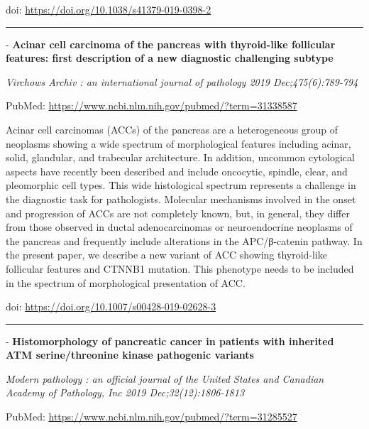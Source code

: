 \documentclass[
]{article}
\renewcommand{\linethickness}{0.05em}
\begin{document}
doi: \url{https://doi.org/10.1038/s41379-019-0398-2}

\begin{center}\rule{0.5\linewidth}{\linethickness}\end{center}

- \textbf{Acinar cell carcinoma of the pancreas with thyroid-like
follicular features: first description of a new diagnostic challenging
subtype}

\emph{Virchows Archiv : an international journal of pathology 2019
Dec;475(6):789-794}

PubMed: \url{https://www.ncbi.nlm.nih.gov/pubmed/?term=31338587}

Acinar cell carcinomas (ACCs) of the pancreas are a heterogeneous group
of neoplasms showing a wide spectrum of morphological features including
acinar, solid, glandular, and trabecular architecture. In addition,
uncommon cytological aspects have recently been described and include
oncocytic, spindle, clear, and pleomorphic cell types. This wide
histological spectrum represents a challenge in the diagnostic task for
pathologists. Molecular mechanisms involved in the onset and progression
of ACCs are not completely known, but, in general, they differ from
those observed in ductal adenocarcinomas or neuroendocrine neoplasms of
the pancreas and frequently include alterations in the APC/β-catenin
pathway. In the present paper, we describe a new variant of ACC showing
thyroid-like follicular features and CTNNB1 mutation. This phenotype
needs to be included in the spectrum of morphological presentation of
ACC.

doi: \url{https://doi.org/10.1007/s00428-019-02628-3}

\begin{center}\rule{0.5\linewidth}{\linethickness}\end{center}

- \textbf{Histomorphology of pancreatic cancer in patients with
inherited ATM serine/threonine kinase pathogenic variants}

\emph{Modern pathology : an official journal of the United States and
Canadian Academy of Pathology, Inc 2019 Dec;32(12):1806-1813}

PubMed: \url{https://www.ncbi.nlm.nih.gov/pubmed/?term=31285527}
\end{document}
